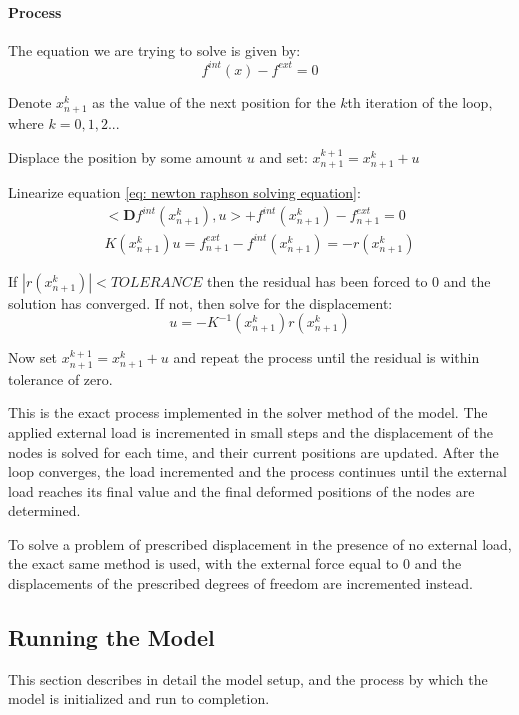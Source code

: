 \documentclass[]{spie}  %
\begin{document}
\paragraph{Process}
The equation we are trying to solve is given by:
\begin{equation}
\label{eq: newton raphson solving equation}
f^{int}(x) - f^{ext} = 0
\end{equation}

Denote $x^k_{n+1}$ as the value of the next position for the $k$th iteration of the loop, where $k = 0,1,2...$ 

Displace the position by some amount $u$ and set: $x^{k+1}_{n+1} = x^k_{n+1} + u$

Linearize equation \ref{eq: newton raphson solving equation}: 
\begin{gather}
<\bm{D} f^{int}(x^k_{n+1}), u> + f^{int}(x^k_{n+1}) - f^{ext}_{n+1} = 0 \\
K(x^k_{n+1})u = f^{ext}_{n+1} - f^{int}(x^k_{n+1}) = -r(x^k_{n+1}) 
\end{gather}

If $|r(x^k_{n+1})| < TOLERANCE $ then the residual has been forced to 0 and the solution has converged. If not, then solve for the displacement:
\begin{equation}
u = -K^{-1}(x^k_{n+1}) r(x^k_{n+1})
\end{equation}

Now set $ x^{k+1}_{n+1} = x^k_{n+1} + u $ and repeat the process until the residual is within tolerance of zero. 

This is the exact process implemented in the solver method of the model. The applied external load is incremented in small steps and the displacement of the nodes is solved for each time, and their current positions are updated. After the loop converges, the load incremented and the process continues until the external load reaches its final value and the final deformed positions of the nodes are determined. 

To solve a problem of prescribed displacement in the presence of no external load, the exact same method is used, with the external force equal to 0 and the displacements of the prescribed degrees of freedom are incremented instead. 

\subsection{Running the Model}
This section describes in detail the model setup, and the process by which the model is initialized and run to completion. 
\end{document}
